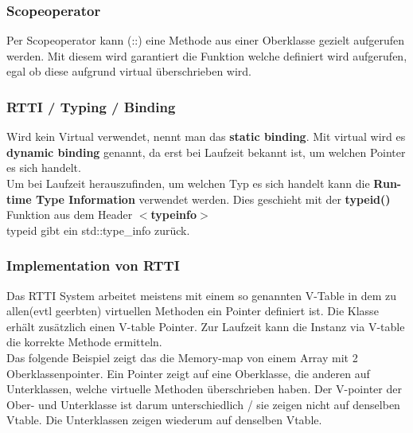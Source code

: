 \subsubsection{Scopeoperator}

Per Scopeoperator kann (::) eine Methode aus einer Oberklasse gezielt aufgerufen werden. 
Mit diesem wird garantiert die Funktion welche definiert wird aufgerufen, egal ob diese aufgrund virtual überschrieben wird. 



\subsubsection{RTTI / Typing / Binding}

Wird kein Virtual verwendet, nennt man das \textbf{static binding}. 
Mit virtual wird es \textbf{dynamic binding} genannt, da erst bei Laufzeit bekannt ist, um welchen Pointer es sich handelt.\\
Um bei Laufzeit herauszufinden, um welchen Typ es sich handelt kann die \textbf{Run-time Type Information} verwendet werden. 
Dies geschieht mit der \textbf{typeid()} Funktion aus dem Header \textbf{$<$typeinfo$>$}\\
typeid gibt ein std::type\_info zurück. 



\subsubsection{Implementation von RTTI}

Das RTTI System arbeitet meistens mit einem so genannten V-Table in dem zu allen(evtl geerbten) virtuellen Methoden ein Pointer definiert ist. 
Die Klasse erhält zusätzlich einen V-table Pointer. 
Zur Laufzeit kann die Instanz via V-table die korrekte Methode ermitteln.\\

Das folgende Beispiel zeigt das die Memory-map von einem Array mit 2 Oberklassenpointer. 
Ein Pointer zeigt auf eine Oberklasse, die anderen auf Unterklassen, welche virtuelle Methoden überschrieben haben. 
Der V-pointer der Ober- und Unterklasse ist darum unterschiedlich / sie zeigen nicht auf denselben Vtable. 
Die Unterklassen zeigen wiederum auf denselben Vtable.  

